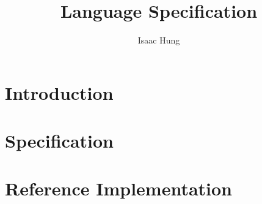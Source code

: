 \documentclass{article}
\title{Language Specification}
\author{Isaac Hung}
\begin{document}
\section{Introduction}

\section{Specification}

\section{Reference Implementation}
\end{document}
